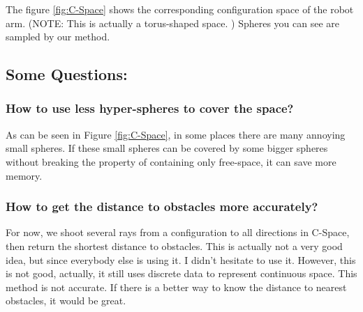 \documentclass{article}
\begin{document}
    The figure \ref{fig:C-Space} shows the corresponding configuration space of the robot arm. (NOTE: This is actually a torus-shaped space. ) Spheres you can see are sampled by our method.

	\subsection{Some Questions:}
 		\subsubsection{How to use less hyper-spheres to cover the space?}
    As can be seen in Figure \ref{fig:C-Space}, in some places there are many annoying small spheres. If these small spheres can be covered by some bigger spheres without breaking the property of containing only free-space, it can save more memory.  

 		\subsubsection{How to get the distance to obstacles more accurately?}
    For now, we shoot several rays from a configuration to all directions in C-Space, then return the shortest distance to obstacles. This is actually not a very good idea, but since everybody else is using it. I didn't hesitate to use it. However, this is not good, actually, it still uses discrete data to represent continuous space. This method is not accurate. If there is a better way to know the distance to nearest obstacles, it would be great.
\end{document}
